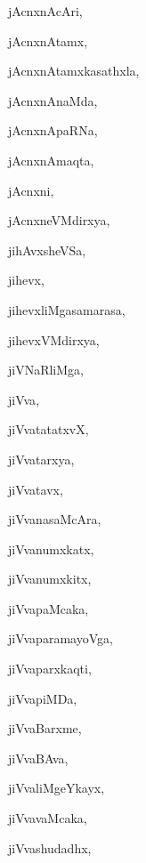 \begin{multicols}{3}
{\noindent
{jAcnxnAcAri}, \pageref{jAcnxnAcAri}

\noindent
{jAcnxnAtamx}, \pageref{jAcnxnAtamx}

\noindent
{jAcnxnAtamxkasathxla}, \pageref{jAcnxnAtamxkasathxla}

\noindent
{jAcnxnAnaMda}, \pageref{jAcnxnAnaMda}

\noindent
{jAcnxnApaRNa}, \pageref{jAcnxnApaRNa}

\noindent
{jAcnxnAmaqta}, \pageref{jAcnxnAmaqta}

\noindent
{jAcnxni}, \pageref{jAcnxni}

\noindent
{jAcnxneVMdirxya}, \pageref{jAcnxneVMdirxya}

\noindent
{jihAvxsheVSa}, \pageref{jihAvxsheVSa}

\noindent
{jihevx}, \pageref{jihevx}

\noindent
{jihevxliMgasamarasa}, \pageref{jihevxliMgasamarasa}

\noindent
{jihevxVMdirxya}, \pageref{jihevxVMdirxya}

\noindent
{jiVNaRliMga}, \pageref{jiVNaRliMga}

\noindent
{jiVva}, \pageref{jiVva}

\noindent
{jiVvatatatxvX}, \pageref{jiVvatatatxvX}

\noindent
{jiVvatarxya}, \pageref{jiVvatarxya}

\noindent
{jiVvatavx}, \pageref{jiVvatavx}

\noindent
{jiVvanasaMcAra}, \pageref{jiVvanasaMcAra}

\noindent
{jiVvanumxkatx}, \pageref{jiVvanumxkatx}

\noindent
{jiVvanumxkitx}, \pageref{jiVvanumxkitx}

\noindent
{jiVvapaMcaka}, \pageref{jiVvapaMcaka}

\noindent
{jiVvaparamayoVga}, \pageref{jiVvaparamayoVga}

\noindent
{jiVvaparxkaqti}, \pageref{jiVvaparxkaqti}

\noindent
{jiVvapiMDa}, \pageref{jiVvapiMDa}

\noindent
{jiVvaBarxme}, \pageref{jiVvaBarxme}

\noindent
{jiVvaBAva}, \pageref{jiVvaBAva}

\noindent
{jiVvaliMgeYkayx}, \pageref{jiVvaliMgeYkayx}

\noindent
{jiVvavaMcaka}, \pageref{jiVvavaMcaka}

\noindent
{jiVvashudadhx}, \pageref{jiVvashudadhx}

}
\end{multicols}

